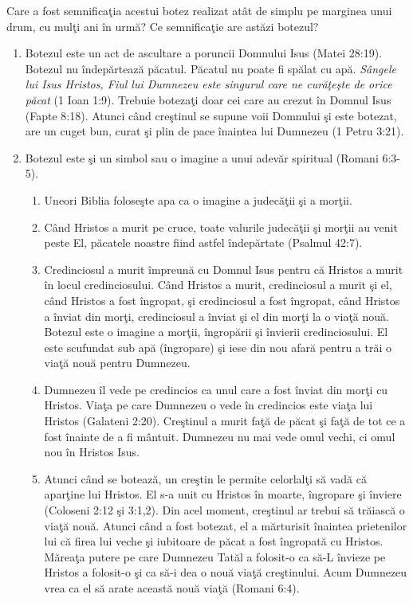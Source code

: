 Care a fost semnificaţia acestui botez realizat atât de simplu pe marginea unui drum, cu mulţi ani în urmă? Ce semnificaţie are astăzi botezul?

\begin{enumerate}

	\item Botezul este un act de ascultare a poruncii Domnului Isus (Matei 28:19). Botezul nu îndepărtează păcatul. Păcatul nu poate fi spălat cu apă. \textit{Sângele lui Isus Hristos, Fiul lui Dumnezeu este singurul care ne curăţeşte de orice păcat} (1 Ioan 1:9). Trebuie botezaţi doar cei care au crezut în Domnul Isus (Fapte 8:18). Atunci când creştinul se supune voii Domnului şi este botezat, are un cuget bun, curat şi plin de pace înaintea lui Dumnezeu (1 Petru 3:21).
	
	\item Botezul este şi un simbol sau o imagine a unui adevăr spiritual (Romani 6:3-5).
	
	\begin{enumerate}
		\item Uneori Biblia foloseşte apa ca o imagine a judecăţii şi a morţii. 
		\item Când Hristos a murit pe cruce, toate valurile judecăţii şi morţii au venit peste El, păcatele noastre fiind astfel îndepărtate (Psalmul 42:7).
		
		\item Credinciosul a murit împreună cu Domnul Isus pentru că Hristos a murit în locul credinciosului. Când Hristos a murit, credinciosul a murit şi el, când Hristos a fost îngropat, şi credinciosul a fost îngropat, când Hristos a înviat din morţi, credinciosul a înviat şi el din morţi la o viaţă nouă. Botezul este o imagine a morţii, îngropării şi învierii credinciosului. El este scufundat sub apă (îngropare) şi iese din nou afară pentru a trăi o viaţă nouă pentru Dumnezeu.
		
		\item Dumnezeu îl vede pe credincios ca unul care a fost înviat din morţi cu Hristos. Viaţa pe care Dumnezeu o vede în credincios este viaţa lui Hristos (Galateni 2:20). Creştinul a murit faţă de păcat şi faţă de tot ce a fost înainte de a fi mântuit. Dumnezeu nu mai vede omul vechi, ci omul nou în Hristos Isus.
		
		\item Atunci când se botează, un creştin le permite celorlalţi să vadă că aparţine lui Hristos. El s-a unit cu Hristos în moarte, îngropare şi înviere (Coloseni 2:12 şi 3:1,2). Din acel moment, creştinul ar trebui să trăiască o viaţă nouă. Atunci când a fost botezat, el a mărturisit înaintea prietenilor lui că firea lui veche şi iubitoare de păcat a fost îngropată cu Hristos. Măreaţa putere pe care Dumnezeu Tatăl a folosit-o ca să-L învieze pe Hristos a folosit-o şi ca să-i dea o nouă viaţă creştinului. Acum Dumnezeu vrea ca el să arate această nouă viaţă (Romani 6:4).
	\end{enumerate}
	

\end{enumerate}
